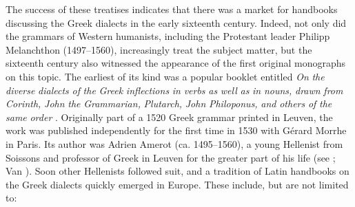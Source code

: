 \documentclass[output=paper]{langsci/langscibook}
\begin{document}
The success of these treatises indicates that there was a market for handbooks discussing the Greek dialects in the early sixteenth century. Indeed, not only did the grammars of Western humanists, including the Protestant leader Philipp Melanchthon (1497–1560), increasingly treat the subject matter, but the sixteenth century also witnessed the appearance of the first original monographs on this topic. The earliest of its kind was a popular booklet entitled \textit{On} \textit{the} \textit{diverse} \textit{dialects} \textit{of} \textit{the} \textit{Greek} \textit{inflections} \textit{in} \textit{verbs} \textit{as} \textit{well} \textit{as} \textit{in} \textit{nouns,} \textit{drawn} \textit{from} \textit{Corinth,} \textit{John} \textit{the} \textit{Grammarian,} \textit{Plutarch,} \textit{John} \textit{Philoponus,} \textit{and} \textit{others} \textit{of} \textit{the} \textit{same} \textit{order} \citep{Amerot1530}. Originally part of a 1520 Greek grammar printed in Leuven, the work was published independently for the first time in 1530 with Gérard Morrhe in Paris. Its author was Adrien Amerot (ca. 1495–1560), a young Hellenist from Soissons and professor of Greek in Leuven for the greater part of his life (see \citealt{Hummel1999}; Van \citealt{Rooy2019}). Soon other Hellenists followed suit, and a tradition of Latin handbooks on the Greek dialects quickly emerged in Europe. These include, but are not limited to:
\end{document}
